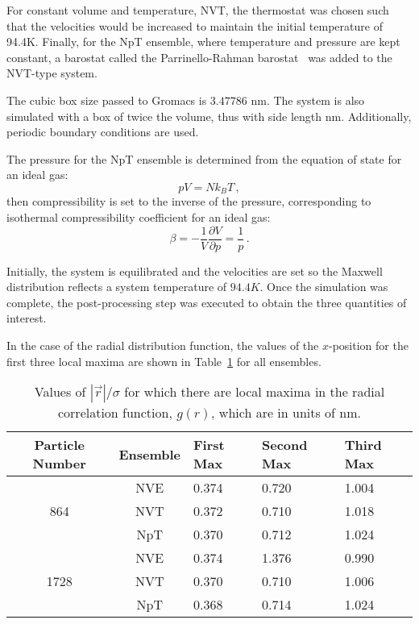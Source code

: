\documentclass[12pt]{article}
\begin{document}
For constant volume and temperature, NVT, the thermostat was chosen such that the velocities would be increased to maintain the initial temperature of 94.4K. Finally, for the NpT ensemble, where temperature and pressure are kept constant, a barostat called the Parrinello-Rahman barostat~\cite{Parrinello1981} was added to the NVT-type system.



The cubic box size passed to Gromacs is $3.47786 \text{ nm}$. The system is also simulated with a box of twice the volume, thus with side length $\text{nm}$. Additionally, periodic boundary conditions are used.

The pressure for the NpT ensemble is determined from the equation of state for an ideal gas:
\begin{equation}
	pV = Nk_B T\,,
\end{equation}
then compressibility is set to the inverse of the pressure, corresponding to isothermal compressibility coefficient for an ideal gas:
\begin{equation}
	\beta= -\frac{1}{V}\frac{\partial V}{\partial p} = \frac{1}{p}\,.
\end{equation}

Initially, the system is equilibrated and the velocities are set so the Maxwell distribution reflects a system temperature of $94.4K$. 
%
Once the simulation was complete, the post-processing step was executed to obtain the three quantities of interest.

In the case of the radial distribution function, the values of the $x$-position for the first three local maxima are shown in Table~\ref{tab:rdfmax} for all ensembles. 

\begin{table}
	\caption{Values of $|\vec{r}|/\sigma$ for which there are local maxima in the radial correlation function, $g(r)$, which are in units of nm.}
	\centering
	\begin{tabular}{|c|c|l|l|l|}
		\hline
		Particle Number & Ensemble & First Max & Second Max & Third Max \\ \hline
		\multirow{3}{*}{864} & NVE & 0.374 & 0.720 & 1.004   \\ \cline{2-5}
		 & NVT & 0.372 & 0.710 & 1.018  \\ \cline{2-5}
		 & NpT & 0.370 & 0.712 & 1.024  \\ \hline
		\multirow{3}{*}{1728} & NVE & 0.374 & 1.376 & 0.990  \\ \cline{2-5}
		& NVT & 0.370 & 0.710 & 1.006   \\ \cline{2-5}
		& NpT & 0.368 & 0.714 & 1.024  \\ \hline
	\end{tabular}
	\label{tab:rdfmax}
\end{table}
\end{document}
